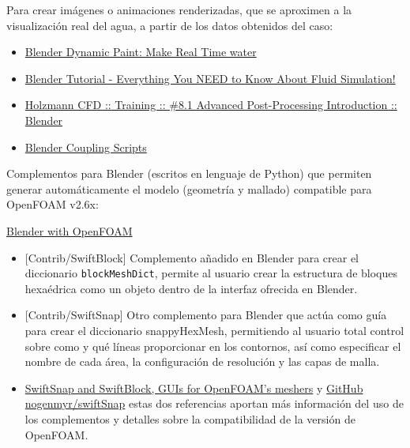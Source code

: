 Para crear imágenes o animaciones renderizadas, que se aproximen a la
visualización real del agua, a partir de los datos obtenidos del caso:

\begin{itemize}
\item
  \href{https://www.youtube.com/watch?v=1zPxogcS3V4\&list=PLmKCiG2w8fxdUljIme1Qkw5lEkwYKsuhf\&index=41\&t=216s}{Blender
  Dynamic Paint: Make Real Time water}
\item
  \href{https://www.youtube.com/watch?v=3o9E2t0cTCchttps://www.youtube.com/watch?v=3o9E2t0cTCc}{Blender
  Tutorial - Everything You NEED to Know About Fluid Simulation!}
\item
  \href{https://www.youtube.com/watch?v=p1YLo5ZWnkI}{Holzmann CFD ::
  Training :: \#8.1 Advanced Post-Processing Introduction :: Blender}
\item
  \href{https://holzmann-cfd.de/openfoam/openfoam-tutorials/blender-coupling}{Blender
  Coupling Scripts}
\end{itemize}

Complementos para Blender (escritos en lenguaje de Python) que permiten
generar automáticamente el modelo (geometría y mallado) compatible para
OpenFOAM v2.6x:

\href{https://openfoamwiki.net/index.php/Blender}{Blender with OpenFOAM}

\begin{itemize}
\item
  {[}Contrib/SwiftBlock{]} Complemento añadido en Blender para crear el
  diccionario \texttt{blockMeshDict}, permite al usuario crear la
  estructura de bloques hexaédrica como un objeto dentro de la interfaz
  ofrecida en Blender.
\item
  {[}Contrib/SwiftSnap{]} Otro complemento para Blender que actúa como
  guía para crear el diccionario snappyHexMesh, permitiendo al usuario
  total control sobre como y qué líneas proporcionar en los contornos,
  así como especificar el nombre de cada área, la configuración de
  resolución y las capas de malla.
\item
  \href{https://www.cfd-online.com/Forums/openfoam-meshing/100604-swiftsnap-swiftblock-guis-openfoams-meshers-2.html}{SwiftSnap
  and SwiftBlock, GUIs for OpenFOAM's meshers} y
  \href{https://github.com/nogenmyr/swiftSnap}{GitHub
  nogenmyr/swiftSnap} estas dos referencias aportan más información del
  uso de los complementos y detalles sobre la compatibilidad de la
  versión de OpenFOAM.
\end{itemize}

